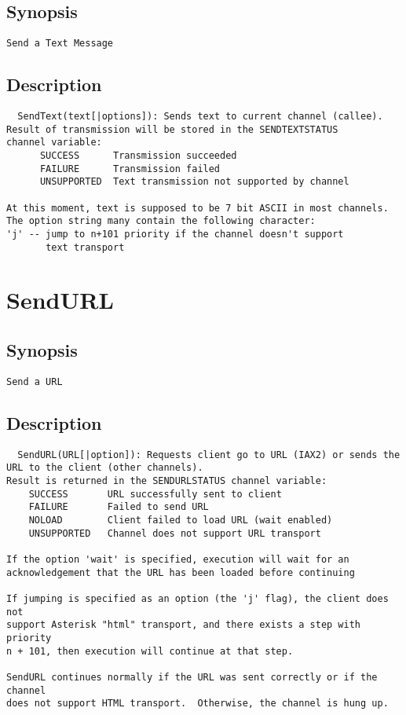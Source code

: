 \subsection{Synopsis}
\begin{verbatim}
Send a Text Message
\end{verbatim}
\subsection{Description}
\begin{verbatim}
  SendText(text[|options]): Sends text to current channel (callee).
Result of transmission will be stored in the SENDTEXTSTATUS
channel variable:
      SUCCESS      Transmission succeeded
      FAILURE      Transmission failed
      UNSUPPORTED  Text transmission not supported by channel

At this moment, text is supposed to be 7 bit ASCII in most channels.
The option string many contain the following character:
'j' -- jump to n+101 priority if the channel doesn't support
       text transport

\end{verbatim}


\section{SendURL}
\subsection{Synopsis}
\begin{verbatim}
Send a URL
\end{verbatim}
\subsection{Description}
\begin{verbatim}
  SendURL(URL[|option]): Requests client go to URL (IAX2) or sends the 
URL to the client (other channels).
Result is returned in the SENDURLSTATUS channel variable:
    SUCCESS       URL successfully sent to client
    FAILURE       Failed to send URL
    NOLOAD        Client failed to load URL (wait enabled)
    UNSUPPORTED   Channel does not support URL transport

If the option 'wait' is specified, execution will wait for an
acknowledgement that the URL has been loaded before continuing

If jumping is specified as an option (the 'j' flag), the client does not
support Asterisk "html" transport, and there exists a step with priority
n + 101, then execution will continue at that step.

SendURL continues normally if the URL was sent correctly or if the channel
does not support HTML transport.  Otherwise, the channel is hung up.

\end{verbatim}


